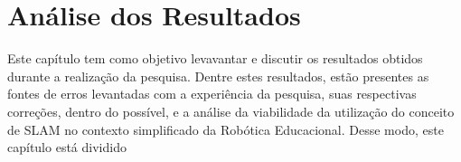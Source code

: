 \chapter[Análise dos Resultados]{Análise dos Resultados}

Este capítulo tem como objetivo levavantar e discutir os resultados obtidos durante a realização da pesquisa. Dentre estes resultados,
estão presentes as fontes de erros levantadas com a experiência da pesquisa, suas respectivas correções, dentro do possível, e a análise da
viabilidade da utilização do conceito de SLAM no contexto simplificado da Robótica Educacional. Desse modo, este capítulo está dividido
